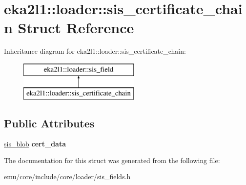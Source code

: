 \hypertarget{structeka2l1_1_1loader_1_1sis__certificate__chain}{}\section{eka2l1\+:\+:loader\+:\+:sis\+\_\+certificate\+\_\+chain Struct Reference}
\label{structeka2l1_1_1loader_1_1sis__certificate__chain}
Inheritance diagram for eka2l1\+:\+:loader\+:\+:sis\+\_\+certificate\+\_\+chain\+:\begin{figure}[H]
\begin{center}
\leavevmode
\includegraphics[height=2.000000cm]{structeka2l1_1_1loader_1_1sis__certificate__chain}
\end{center}
\end{figure}
\subsection*{Public Attributes}
\begin{DoxyCompactItemize}
\item 
\mbox{\label{structeka2l1_1_1loader_1_1sis__certificate__chain_a629a39c913b7a7e968e603674e8f0348}} 
\mbox{\hyperlink{structeka2l1_1_1loader_1_1sis__blob}{sis\+\_\+blob}} {\bfseries cert\+\_\+data}
\end{DoxyCompactItemize}


The documentation for this struct was generated from the following file\+:\begin{DoxyCompactItemize}
\item 
emu/core/include/core/loader/sis\+\_\+fields.\+h\end{DoxyCompactItemize}
